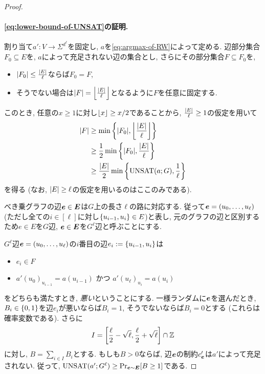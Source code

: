 \begin{proof}
\paragraph*{\cref{eq:lower-bound-of-UNSAT}の証明.}

割り当て$a'\colon V\to \Sigma^{d^{\ell}}$を固定し, $a$を\cref{eq:argmax-of-RW}によって定める.
辺部分集合$F_0\subseteq E$を, $a$によって充足されない辺の集合とし,
さらにその部分集合$F\subseteq F_0$を, 
\begin{itemize}
\item $\abs{F_0} \le \frac{\abs{E}}{\ell}$ならば$F_0=F$,
\item そうでない場合は$\abs{F} = \floor*{\frac{\abs{E}}{\ell}}$となるように$F$を任意に固定する.
\end{itemize}
このとき, 任意の$x\ge 1$に対し$\floor{x}\ge x/2$であることから, $\frac{\abs{E}}{\ell}\ge 1$の仮定を用いて
\begin{align}
  \abs{F} &\ge \min\qty{ \abs{F_0}, \floor*{\frac{\abs{E}}{\ell}} } \nonumber \\
  &\ge \frac{1}{2}\min\qty{ \abs{F_0}, \frac{\abs{E}}{\ell} } \nonumber \\
  &\ge \frac{\abs{E}}{2}\min\qty{ \UNSAT(a;G), \frac{1}{\ell} } \label{eq:abs-F}
\end{align}
を得る (なお, $\abs{E}\ge \ell$の仮定を用いるのはここのみである).

べき乗グラフの辺$\bolde \in \boldE$は$G$上の長さ$\ell$の路に対応する.
従って$\bolde = (u_0,\dots,u_\ell)$ (ただし全ての$i\in[\ell]$に対し$\qty{u_{i-1},u_{i}}\in E$)と表し, 元のグラフの辺と区別するため$e\in E$を$G$辺, $\bolde\in\boldE$を$G^\ell$辺と呼ぶことにする.

$G^\ell$辺$\bolde=(u_0,\dots,u_\ell)$の$i$番目の辺$e_i:=\qty{u_{i-1},u_i}$は
\begin{itemize}
  \item $e_i \in F$
  \item $a'(u_{0})_{u_{i-1}} = a(u_{i-1})$ かつ $a'(u_\ell)_{u_i} = a(u_i)$
\end{itemize}
をどちらも満たすとき, \emph{悪い}ということにする.
一様ランダムに$\bolde$を選んだとき, $B_i\in\binset$を辺$e_i$が悪いならば$B_i=1$, そうでないならば$B_i=0$とする (これらは確率変数である).
さらに
\begin{align*}
  I = \qty[\frac{\ell}{2} - \sqrt{\ell}, \frac{\ell}{2} + \sqrt{\ell}] \cap \mathbb{Z}
\end{align*}
に対し, $B=\sum_{i\in I}B_i$とする.
もしも$B>0$ならば, 辺$\bolde$の制約$c'_{\bolde}$は$a'$によって充足されない.
従って, $\UNSAT(a';G^\ell) \ge \Pr_{\bolde\sim \boldE}[B\ge 1]$である.


\end{proof}
